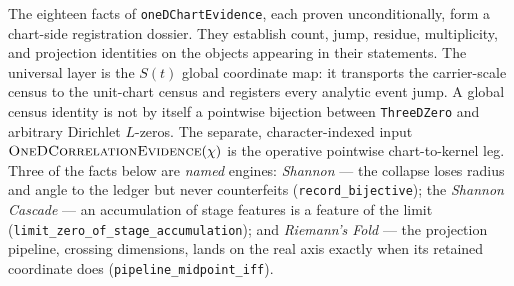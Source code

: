 \documentclass[11pt]{article}
\theoremstyle{definition}
\begin{document}
The eighteen facts of \texttt{oneDChartEvidence}, each proven
unconditionally, form a chart-side registration dossier.  They establish
count, jump, residue, multiplicity, and projection identities on the objects
appearing in their statements.  The universal layer is the \(S(t)\) global
coordinate map: it transports the carrier-scale census to the unit-chart
census and registers every analytic event jump.  A global census identity is
not by itself a pointwise bijection between \texttt{ThreeDZero} and arbitrary
Dirichlet \(L\)-zeros.  The separate, character-indexed input
\(\textsc{OneDCorrelationEvidence}(\chi)\) is the operative pointwise
chart-to-kernel leg.
Three of the facts below are \emph{named} engines: \emph{Shannon} --- the collapse loses
radius and angle to the ledger but never counterfeits (\texttt{record\_bijective}); the
\emph{Shannon Cascade} --- an accumulation of stage features is a feature of the limit
(\texttt{limit\_zero\_of\_stage\_accumulation}); and \emph{Riemann's Fold} --- the
projection pipeline, crossing dimensions, lands on the real axis exactly when its retained
coordinate does (\texttt{pipeline\_midpoint\_iff}).
\end{document}
